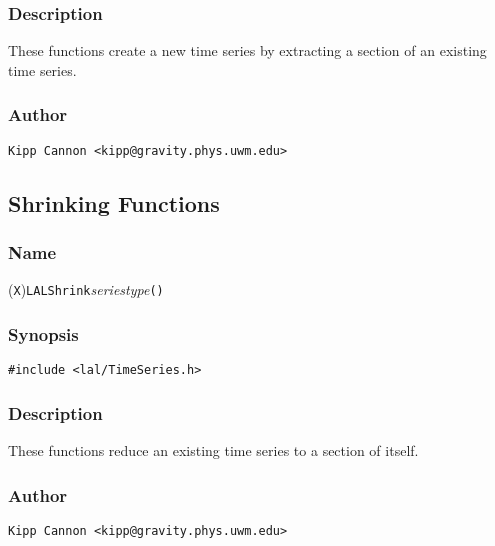 \subsubsection{Description}

These functions create a new time series by extracting a section of an
existing time series.

\subsubsection{Author}

\verb|Kipp Cannon <kipp@gravity.phys.uwm.edu>|


\subsection{Shrinking Functions}

\subsubsection{Name}

(\texttt{X})\texttt{LALShrink}\textit{seriestype}\texttt{()}

\subsubsection{Synopsis}

\begin{verbatim}
#include <lal/TimeSeries.h>
\end{verbatim}


\subsubsection{Description}

These functions reduce an existing time series to a section of itself.

\subsubsection{Author}

\verb|Kipp Cannon <kipp@gravity.phys.uwm.edu>|
